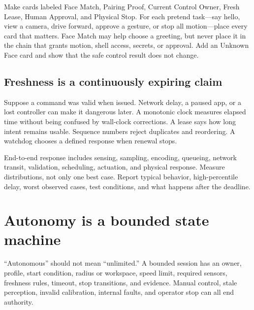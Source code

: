 \begin{missionbox}[title={SORT THE EVIDENCE}]
Make cards labeled Face Match, Pairing Proof, Current Control Owner, Fresh Lease, Human Approval, and Physical Stop. For each pretend task---say hello, view a camera, drive forward, approve a gesture, or stop all motion---place every card that matters. Face Match may help choose a greeting, but never place it in the chain that grants motion, shell access, secrets, or approval. Add an Unknown Face card and show that the safe control result does not change.
\end{missionbox}

\section*{Freshness is a continuously expiring claim}

Suppose a command was valid when issued. Network delay, a paused app, or a lost controller can make it dangerous later. A monotonic clock measures elapsed time without being confused by wall-clock corrections. A lease says how long intent remains usable. Sequence numbers reject duplicates and reordering. A watchdog chooses a defined response when renewal stops.

\begin{conceptbox}[title={LATENCY HAS A BUDGET}]
End-to-end response includes sensing, sampling, encoding, queueing, network transit, validation, scheduling, actuation, and physical response. Measure distributions, not only one best case. Report typical behavior, high-percentile delay, worst observed cases, test conditions, and what happens after the deadline.
\end{conceptbox}

\clearpage
\chapter{Autonomy is a bounded state machine}

``Autonomous'' should not mean ``unlimited.'' A bounded session has an owner, profile, start condition, radius or workspace, speed limit, required sensors, freshness rules, timeout, stop transitions, and evidence. Manual control, stale perception, invalid calibration, internal faults, and operator stop can all end authority.

\begin{center}
\end{center}

